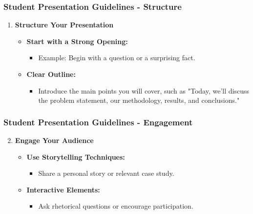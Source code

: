 \documentclass[aspectratio=169]{beamer}
\begin{document}
\begin{frame}[fragile]
    \frametitle{Student Presentation Guidelines - Structure}
    \begin{enumerate}
        \item \textbf{Structure Your Presentation}
            \begin{itemize}
                \item \textbf{Start with a Strong Opening:} 
                    \begin{itemize}
                        \item Example: Begin with a question or a surprising fact.
                    \end{itemize}
                \item \textbf{Clear Outline:} 
                    \begin{itemize}
                        \item Introduce the main points you will cover, such as "Today, we'll discuss the problem statement, our methodology, results, and conclusions."
                    \end{itemize}
            \end{itemize}
    \end{enumerate}
\end{frame}

\begin{frame}[fragile]
    \frametitle{Student Presentation Guidelines - Engagement}
    \begin{enumerate}
        \setcounter{enumi}{1}
        \item \textbf{Engage Your Audience}
            \begin{itemize}
                \item \textbf{Use Storytelling Techniques:} 
                    \begin{itemize}
                        \item Share a personal story or relevant case study.
                    \end{itemize}
                \item \textbf{Interactive Elements:} 
                    \begin{itemize}
                        \item Ask rhetorical questions or encourage participation.
                    \end{itemize}
            \end{itemize}
    \end{enumerate}
\end{frame}
\end{document}
